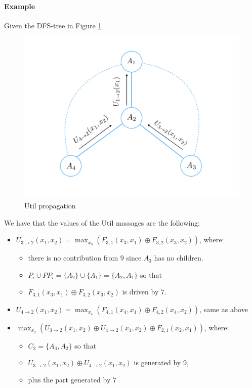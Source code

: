 \documentclass[10pt,a4paper]{article}
\begin{document}
\paragraph{Example}
Given the DFS-tree in Figure \ref{fig:util_p}

\begin{figure}[H]
\centering
\includegraphics[scale=0.3]{images/util_p1.jpeg}
\caption{Util propagation}
\label{fig:util_p}
\end{figure}

We have that the values of the Util massages are the following:
\begin{itemize}
\item  $U_{3 \rightarrow 2}(x_1,x_2)=\max_{x_3}(F_{3,1}(x_3,x_1) \oplus F_{3,2}(x_3,x_2))$, where:
	\begin{itemize}
	\item  there is no contribution from $9$ since $A_3$ has no children.
	\item $ P_i \cup PP_i=\{A_2\} \cup \{A_1\}=\{A_2,A_1\}$ so that
	\item $F_{3,1}(x_3,x_1) \oplus F_{3,2}(x_3,x_2)$ is driven by $7$.
	\end{itemize}

\item  $U_{4 \rightarrow 2}(x_1,x_2)=\max_{x_4}(F_{4,1}(x_4,x_1) \oplus F_{4,2}(x_4,x_2))$, same as above

\item $\max_{x_2}(U_{3 \rightarrow 2}(x_1,x_2) \oplus U_{4 \rightarrow 2}(x_1,x_2) \oplus  F_{2,1}(x_2,x_1))$, where:

	\begin{itemize}
	\item $C_2=\lbrace A_3,A_2\rbrace$ so that
	\item $U_{3 \rightarrow 2}(x_1,x_2) \oplus U_{4 \rightarrow 2}(x_1,x_2)$ is generated by $9$,
	\item plus the part generated by $7$
	\end{itemize}


\end{itemize}
\end{document}

